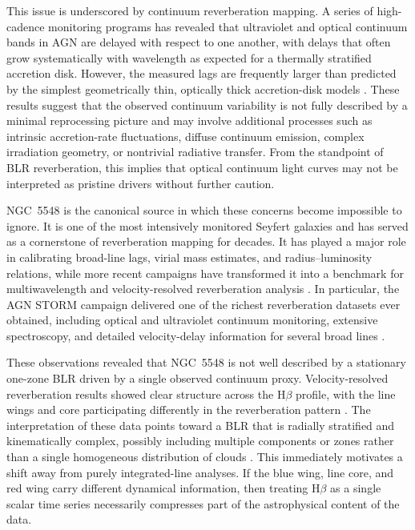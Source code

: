 \documentclass[fleqn,usenatbib]{mnras}
\begin{document}
This issue is underscored by continuum reverberation mapping. A series of high-cadence monitoring programs has revealed that ultraviolet and optical continuum bands in AGN are delayed with respect to one another, with delays that often grow systematically with wavelength as expected for a thermally stratified accretion disk. However, the measured lags are frequently larger than predicted by the simplest geometrically thin, optically thick accretion-disk models \cite{Fausnaugh2016,Fausnaugh2017,Edelson2019,Cackett2021}. These results suggest that the observed continuum variability is not fully described by a minimal reprocessing picture and may involve additional processes such as intrinsic accretion-rate fluctuations, diffuse continuum emission, complex irradiation geometry, or nontrivial radiative transfer. From the standpoint of BLR reverberation, this implies that optical continuum light curves may not be interpreted as pristine drivers without further caution.

NGC~5548 is the canonical source in which these concerns become impossible to ignore. It is one of the most intensively monitored Seyfert galaxies and has served as a cornerstone of reverberation mapping for decades. It has played a major role in calibrating broad-line lags, virial mass estimates, and radius--luminosity relations, while more recent campaigns have transformed it into a benchmark for multiwavelength and velocity-resolved reverberation analysis \cite{Peterson2002,BentzKatz2015,Cackett2021}. In particular, the AGN STORM campaign delivered one of the richest reverberation datasets ever obtained, including optical and ultraviolet continuum monitoring, extensive spectroscopy, and detailed velocity-delay information for several broad lines \cite{DeRosa2015,Pei2017,Horne2021}.

These observations revealed that NGC~5548 is not well described by a stationary one-zone BLR driven by a single observed continuum proxy. Velocity-resolved reverberation results showed clear structure across the H$\beta$ profile, with the line wings and core participating differently in the reverberation pattern \cite{Pei2017,Horne2021}. The interpretation of these data points toward a BLR that is radially stratified and kinematically complex, possibly including multiple components or zones rather than a single homogeneous distribution of clouds \cite{Horne2021,LongDexter2025}. This immediately motivates a shift away from purely integrated-line analyses. If the blue wing, line core, and red wing carry different dynamical information, then treating H$\beta$ as a single scalar time series necessarily compresses part of the astrophysical content of the data.
\end{document}
